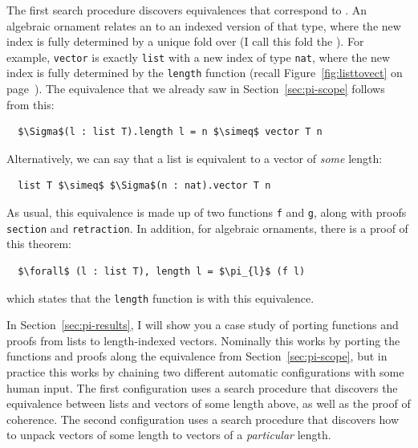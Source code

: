 
The first search procedure discovers equivalences that correspond to .
An algebraic ornament relates an  to an indexed version of that type,
where the new index is fully determined by a unique fold over \Aa (I call this fold the ). 
For example, \lstinline{vector} is exactly \lstinline{list} with a new index of type \lstinline{nat},
where the new index is fully determined by the \lstinline{length} function (recall Figure~\ref{fig:listtovect} on page~\pageref{fig:listtovect}).
The equivalence that we already saw in Section~\ref{sec:pi-scope} follows from this:

\begin{lstlisting}
  $\Sigma$(l : list T).length l = n $\simeq$ vector T n
\end{lstlisting}
Alternatively, we can say that a list is equivalent to a vector of \textit{some} length:

\begin{lstlisting}
  list T $\simeq$ $\Sigma$(n : nat).vector T n
\end{lstlisting}
As usual, this equivalence is made up of two functions \lstinline{f} and \lstinline{g}, along with proofs \lstinline{section} and \lstinline{retraction}.
In addition, for algebraic ornaments, there is a proof of this theorem:

\begin{lstlisting}
  $\forall$ (l : list T), length l = $\pi_{l}$ (f l)
\end{lstlisting}
which states that the \lstinline{length} function is  with this equivalence.

In Section~\ref{sec:pi-results}, I will show you a case study of porting functions and proofs from lists to length-indexed vectors.
Nominally this works by porting the functions and proofs along the equivalence from Section~\ref{sec:pi-scope},
but in practice this works by chaining two different automatic configurations with some human input.
The first configuration uses a search procedure that discovers the equivalence between lists and vectors of some length above,
as well as the proof of coherence.
The second configuration uses a search procedure that discovers how to unpack vectors of some length to vectors of a \textit{particular} length.

